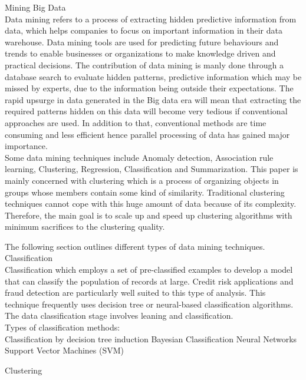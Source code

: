 \documentclass[conference]{IEEEtran}
\begin{document}
Mining Big Data \\
Data mining refers to a process of extracting hidden predictive information from data, which helps companies to focus on important information in their data warehouse. Data mining tools are used for predicting future behaviours and trends to enable businesses or organizations to make knowledge driven and practical decisions. The contribution of data mining is manly done through a database search to evaluate hidden patterns, predictive information which may be missed by experts, due to the information being outside their expectations. The rapid upsurge in data generated in the Big data era will mean that extracting the required patterns hidden on this data will become very tedious if conventional approaches are used. In addition to that, conventional methods are time consuming and less efficient hence parallel processing of data has gained major importance.\\
Some data mining techniques include Anomaly detection, Association rule learning, Clustering, Regression, Classification and Summarization. This paper is mainly concerned with clustering which is a process of organizing objects in groups whose members contain some kind of similarity. Traditional clustering techniques cannot cope with this huge amount of data because of its complexity. Therefore, the main goal is to scale up and speed up clustering algorithms with minimum sacrifices to the clustering quality. 

The following section outlines different types of data mining techniques.\\

Classification \\

Classification which employs a set of pre-classified examples to develop a model that can classify the population of records at large. Credit risk applications and fraud detection are particularly well suited to this type of analysis. This technique frequently uses decision tree or neural-based classification algorithms. The data classification stage involves leaning and classification. \\

Types of classification methods:\\

Classification by decision tree induction 
Bayesian Classification 
Neural Networks 
Support Vector Machines (SVM) 


Clustering \\
\end{document}
